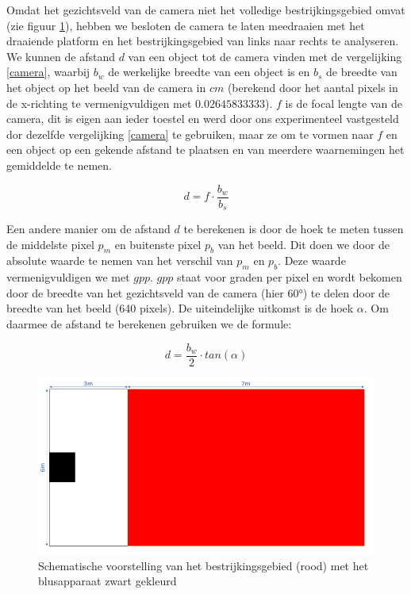 \documentclass[kulak]{kulakarticle} %
\begin{document}
			Omdat het gezichtsveld van de camera niet het volledige bestrijkingsgebied omvat (zie figuur \ref{bestrijkingsgebied}), hebben we besloten de camera te laten meedraaien met het draaiende platform en het bestrijkingsgebied van links naar rechts te analyseren. \\

			We kunnen de afstand \(d\) van een object tot de camera vinden met de vergelijking \ref{camera}, waarbij \(b_w\) de werkelijke breedte van een object is en \(b_s\) de breedte van het object op het beeld van de camera in \(cm\) (berekend door het aantal pixels in de x-richting te vermenigvuldigen met \(0.02645833333\)). \(f\) is de focal lengte van de camera, dit is eigen aan ieder toestel en werd door ons experimenteel vastgesteld dor dezelfde vergelijking \ref{camera} te gebruiken, maar ze om te vormen naar \(f\) en een object op een gekende afstand te plaatsen en van meerdere waarnemingen het gemiddelde te nemen.
			 
				\begin{equation} \label{camera}
					d = f \cdot \frac{b_w}{b_s}
				\end{equation}

			Een andere manier om de afstand \(d\) te berekenen is door de hoek te meten tussen de middelste pixel \(p_m\) en buitenste pixel \(p_b\) van het beeld. Dit doen we door de absolute waarde te nemen van het verschil van \(p_m\) en \(p_b\). Deze waarde vermenigvuldigen we met \(gpp\). \(gpp\) staat voor graden per pixel en wordt bekomen door de breedte van het gezichtsveld van de camera (hier 60°) te delen door de breedte van het beeld (640 pixels). De uiteindelijke uitkomst is de hoek \(\alpha\). Om daarmee de afstand te berekenen gebruiken we de formule:
			
				\begin{equation} \label{camera_2}
					d = \frac{b_w}{2} \cdot tan(\alpha)
				\end{equation}
				
				\begin{figure} [h!]
					\centering                
					\includegraphics[width = .5 \textwidth]{schematische voorstelling bestrijkingsgebied LATEX}
					\caption{Schematische voorstelling van het bestrijkingsgebied (rood) met het blusapparaat zwart gekleurd}
					\label{bestrijkingsgebied}
				\end{figure}
\end{document}
